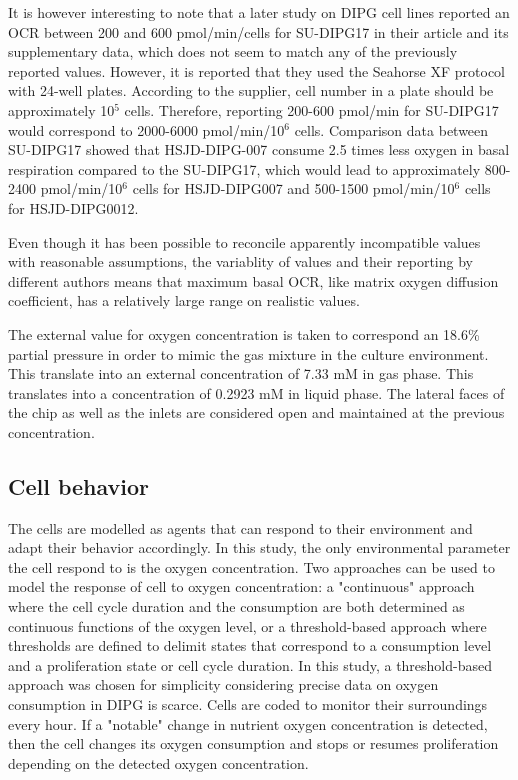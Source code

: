 \documentclass[11pt,a4paper]{article}
\begin{document}
It is however interesting to note that a later study on DIPG cell lines reported an OCR between 200 and 600 pmol/min/cells for SU-DIPG17 in their article and its supplementary data, which does not seem to match any of the previously reported values.\cite{Shen2024} However, it is reported that they used the Seahorse XF protocol with 24-well plates. According to the supplier, cell number in a plate should be approximately 10$^5$ cells. Therefore, reporting 200-600 pmol/min for SU-DIPG17 would correspond to 2000-6000 pmol/min/10$^6$ cells. Comparison data between SU-DIPG17 showed that HSJD-DIPG-007 consume 2.5 times less oxygen in basal respiration compared to the SU-DIPG17, which would lead to approximately 800-2400 pmol/min/10$^6$ cells for HSJD-DIPG007 and 500-1500 pmol/min/10$^6$ cells for HSJD-DIPG0012. 

Even though it has been possible to reconcile apparently incompatible values with reasonable assumptions, the variablity of values and their reporting by different authors means that maximum basal OCR, like matrix oxygen diffusion coefficient, has a relatively large range on realistic values.


The external value for oxygen concentration is taken to correspond an 18.6\% partial pressure in order to mimic the gas mixture in the culture environment. This translate into an external concentration of 7.33 mM in gas phase. This translates into a concentration of 0.2923 mM in liquid phase. The lateral faces of the chip as well as the  inlets are considered open and maintained at the previous concentration.

\subsection{Cell behavior}
The cells are modelled as agents that can respond to their environment and adapt their behavior accordingly. In this study, the only environmental parameter the cell respond to is the oxygen concentration. Two approaches can be used to model the response of cell to oxygen concentration: a "continuous" approach where the cell cycle duration and the consumption are both determined as continuous functions of the oxygen level, or a threshold-based approach where thresholds are defined to delimit states that correspond to a consumption level and a proliferation state or cell cycle duration. In this study, a threshold-based approach was chosen for simplicity considering precise data on oxygen consumption in DIPG is scarce.  Cells are coded to monitor their surroundings every hour. If a "notable" change in nutrient oxygen concentration is detected, then the cell changes its oxygen consumption and stops or resumes proliferation depending on the detected oxygen concentration.
\end{document}
